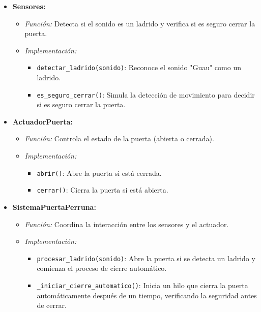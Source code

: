 \begin{itemize}
    \item \textbf{Sensores:}
    \begin{itemize}
        \item \textit{Función:} Detecta si el sonido es un ladrido y verifica si es seguro cerrar la puerta.
        \item \textit{Implementación:} 
        \begin{itemize}
            \item \texttt{detectar\_ladrido(sonido)}: Reconoce el sonido "Guau" como un ladrido.
            \item \texttt{es\_seguro\_cerrar()}: Simula la detección de movimiento para decidir si es seguro cerrar la puerta.
        \end{itemize}
    \end{itemize}
    \item \textbf{ActuadorPuerta:}
    \begin{itemize}
        \item \textit{Función:} Controla el estado de la puerta (abierta o cerrada).
        \item \textit{Implementación:}
        \begin{itemize}
            \item \texttt{abrir()}: Abre la puerta si está cerrada.
            \item \texttt{cerrar()}: Cierra la puerta si está abierta.
        \end{itemize}
    \end{itemize}
    \item \textbf{SistemaPuertaPerruna:}
    \begin{itemize}
        \item \textit{Función:} Coordina la interacción entre los sensores y el actuador.
        \item \textit{Implementación:}
        \begin{itemize}
            \item \texttt{procesar\_ladrido(sonido)}: Abre la puerta si se detecta un ladrido y comienza el proceso de cierre automático.
            \item \texttt{\_iniciar\_cierre\_automatico()}: Inicia un hilo que cierra la puerta automáticamente después de un tiempo, verificando la seguridad antes de cerrar.
        \end{itemize}
    \end{itemize}
\end{itemize}

